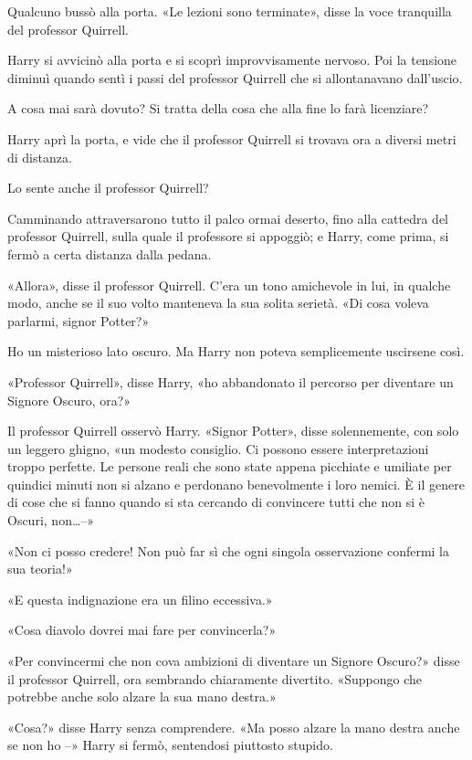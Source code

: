 Qualcuno bussò alla porta. «Le lezioni sono terminate», disse la voce tranquilla del professor Quirrell.

Harry si avvicinò alla porta e si scoprì improvvisamente nervoso. Poi la tensione diminuì quando sentì i passi del professor Quirrell che si allontanavano dall’uscio.

A cosa mai sarà dovuto? Si tratta della cosa che alla fine lo farà licenziare?

Harry aprì la porta, e vide che il professor Quirrell si trovava ora a diversi metri di distanza.

Lo sente anche il professor Quirrell?

Camminando attraversarono tutto il palco ormai deserto, fino alla cattedra del professor Quirrell, sulla quale il professore si appoggiò; e Harry, come prima, si fermò a certa distanza dalla pedana.

«Allora», disse il professor Quirrell. C’era un tono amichevole in lui, in qualche modo, anche se il suo volto manteneva la sua solita serietà. «Di cosa voleva parlarmi, signor Potter?»

Ho un misterioso lato oscuro. Ma Harry non poteva semplicemente uscirsene così.

«Professor Quirrell», disse Harry, «ho abbandonato il percorso per diventare un Signore Oscuro, ora?»

Il professor Quirrell osservò Harry. «Signor Potter», disse solennemente, con solo un leggero ghigno, «un modesto consiglio. Ci possono essere interpretazioni troppo perfette. Le persone reali che sono state appena picchiate e umiliate per quindici minuti non si alzano e perdonano benevolmente i loro nemici. È il genere di cose che si fanno quando si sta cercando di convincere tutti che non si è Oscuri, non…–»

«Non ci posso credere! Non può far sì che ogni singola osservazione confermi la sua teoria!»

«E questa indignazione era un filino eccessiva.»

«Cosa diavolo dovrei mai fare per convincerla?»

«Per convincermi che non cova ambizioni di diventare un Signore Oscuro?» disse il professor Quirrell, ora sembrando chiaramente divertito. «Suppongo che potrebbe anche solo alzare la sua mano destra.»

«Cosa?» disse Harry senza comprendere. «Ma posso alzare la mano destra anche se non ho –» Harry si fermò, sentendosi piuttosto stupido.

